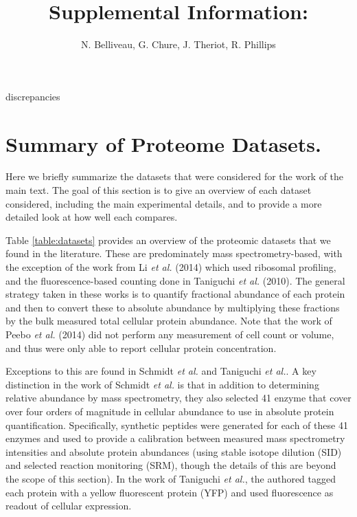 discrepancies \documentclass[11pt, letterpaper]{article}
\author{N. Belliveau, G. Chure, J. Theriot, R. Phillips}
\begin{document}
\title{Supplemental Information: }
\maketitle

\section{Summary of Proteome Datasets.}

Here we briefly summarize the datasets that were considered for the work of the main
text. The goal of this section is to give an overview of each dataset
considered, including the main experimental details, and to provide a more
detailed look at how well each compares.

Table \ref{table:datasets} provides an overview of the proteomic datasets that
we found in the literature. These are predominately mass spectrometry-based,
with the exception of the work from Li {\it et al.} (2014) which used ribosomal
profiling, and the fluorescence-based counting done in Taniguchi {\it et al.}
(2010). The general strategy taken in these works is to quantify fractional
abundance of each protein and then to convert these to absolute abundance by
multiplying these fractions by the bulk measured total cellular protein
abundance. Note that the work of Peebo {\it et al.} (2014) did not perform any
measurement of cell count or volume, and thus were only able to report cellular
protein concentration.

Exceptions to this are found in Schmidt {\it et al.} and Taniguchi {\it et al.}.
A key distinction in the work of Schmidt {\it et al.} is that in addition to
determining relative abundance by mass spectrometry, they also selected 41
enzyme that cover over four orders of magnitude in cellular abundance to use in
absolute protein quantification. Specifically, synthetic peptides were generated
for each of these 41 enzymes and used to provide a calibration between measured
mass spectrometry intensities and absolute protein abundances (using stable
isotope dilution (SID) and selected reaction monitoring (SRM), though the
details of this are beyond the scope of this section). In the work of Taniguchi
{\it et al.},  the authored tagged each protein with a  yellow fluorescent
protein (YFP) and used fluorescence as readout of cellular expression.
\end{document}
